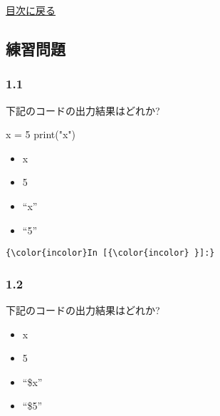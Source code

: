 \documentclass[a4paper,dvipdfmx,uplatex]{jsarticle}
\providecommand{\tightlist}{%
      \setlength{\itemsep}{0pt}\setlength{\parskip}{0pt}}
\newenvironment{Shaded}{}{}
\newcommand{\FloatTok}[1]{\textcolor[rgb]{0.25,0.63,0.44}{{#1}}}
\newcommand{\StringTok}[1]{\textcolor[rgb]{0.25,0.44,0.63}{{#1}}}
\newcommand{\NormalTok}[1]{{#1}}
\begin{document}
    \protect\hyperlink{ux76eeux6b21}{目次に戻る}

    \subsection{練習問題}\label{ux7df4ux7fd2ux554fux984c}

\subsubsection{1.1}\label{section}

下記のコードの出力結果はどれか?

\begin{Shaded}
\begin{Highlighting}[]
\NormalTok{x = }\FloatTok{5}
\NormalTok{print(}\StringTok{"x"}\NormalTok{)}
\end{Highlighting}
\end{Shaded}

\begin{itemize}
\tightlist
\item
  x
\item
  5
\item
  ``x''
\item
  ``5''
\end{itemize}

    \begin{Verbatim}[commandchars=\\\{\}]
{\color{incolor}In [{\color{incolor} }]:} 
\end{Verbatim}

    \subsubsection{1.2}\label{section}

下記のコードの出力結果はどれか?

\begin{Shaded}
\end{Shaded}

\begin{itemize}
\tightlist
\item
  x
\item
  5
\item
  ``\$x''
\item
  ``\$5''
\end{itemize}
\end{document}
